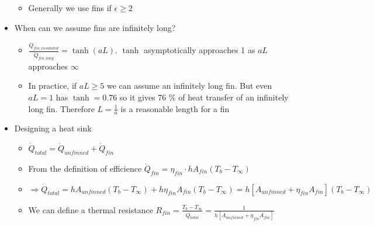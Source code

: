 \documentclass[12pt]{article}
\begin{document}
\begin{itemize}
\begin{itemize}
        \item Generally we use fins if $\epsilon \geq 2$
    \end{itemize}
    \item When can we assume fins are infinitely long? \begin{itemize}
        \item $\frac{\dot{Q}_{fin, insulated}}{\dot{Q}_{fin, long}} = \tanh(aL)$. $\tanh$ asymptotically approaches 1 as $aL$ approaches $\infty$
        \item In practice, if $aL \geq 5$ we can assume an infinitely long fin. But even $aL = 1$ has $\tanh = 0.76$ so it gives 76 \% of heat transfer of an infinitely long fin. Therefore $L = \frac{1}{a}$ is a reasonable length for a fin 
    \end{itemize}
    \item Designing a heat sink \begin{itemize}
        \item $\dot{Q}_{total} = \dot{Q}_{unfinned} + \dot{Q}_{fin}$
        \item From the definition of efficience $\dot{Q}_{fin} = \eta_{fin} \cdot h A_{fin}(T_b - T_{\infty})$
        \item $\Rightarrow \dot{Q}_{total} = hA_{unfinned} (T_b-T_{\infty}) + h \eta_{fin} A_{fin} (T_b - T_{\infty}) = h \left[A_{unfinned} + \eta_{fin}A_{fin}\right] (T_b - T_{\infty})$
        \item We can define a thermal resistance $R_{fin} = \frac{T_b - T_{\infty}}{\dot{Q}_{total}} = \frac{1}{h \left[A_{unfinned} + \eta_{fin}A_{fin}\right]}$
    \end{itemize}
\end{itemize}
\end{document}
